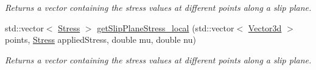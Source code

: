 \begin{DoxyCompactItemize}
\begin{DoxyCompactList}\small\item\em \-Returns a vector containing the stress values at different points along a slip plane. \end{DoxyCompactList}\item 
std\-::vector$<$ \hyperlink{classStress}{\-Stress} $>$ \hyperlink{classSlipPlane_ad86337ca356d72f558468a35024e30bc}{get\-Slip\-Plane\-Stress\-\_\-local} (std\-::vector$<$ \hyperlink{classVector3d}{\-Vector3d} $>$ points, \hyperlink{classStress}{\-Stress} applied\-Stress, double mu, double nu)
\begin{DoxyCompactList}\small\item\em \-Returns a vector containing the stress values at different points along a slip plane. \end{DoxyCompactList}\end{DoxyCompactItemize}
